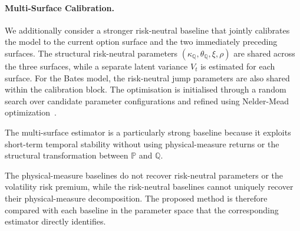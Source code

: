 \documentclass[sigconf,anonymous,review]{acmart}
\begin{document}
\paragraph{Multi-Surface Calibration.}
We additionally consider a stronger risk-neutral baseline that jointly calibrates the model to the current option surface and the two immediately preceding surfaces. The structural risk-neutral parameters $
\left(
\kappa_{\mathbb{Q}},
\theta_{\mathbb{Q}},
\xi,
\rho
\right)$
are shared across the three surfaces, while a separate latent variance \(V_t\) is estimated for each surface. For the Bates model, the risk-neutral jump parameters are also shared within the calibration block. The optimisation is initialised through a random search over candidate parameter configurations and refined using Nelder-Mead optimization~\cite{nelder1965}.

The multi-surface estimator is a particularly strong baseline because it exploits short-term temporal stability without using physical-measure returns or the structural transformation between \(\mathbb{P}\) and \(\mathbb{Q}\).

The physical-measure baselines do not recover risk-neutral parameters or the volatility risk premium, while the risk-neutral baselines cannot uniquely recover their physical-measure decomposition. The proposed method is therefore compared with each baseline in the parameter space that the corresponding estimator directly identifies.
\end{document}
